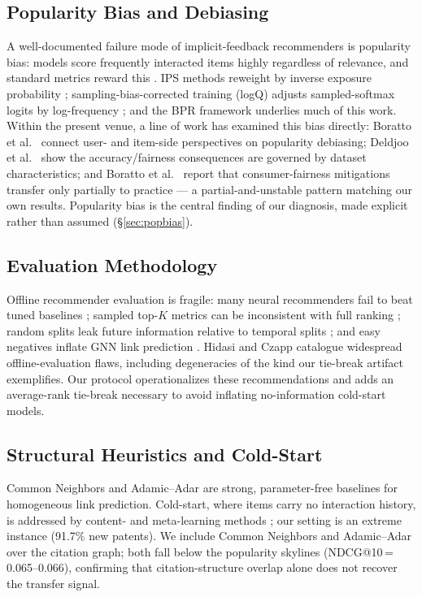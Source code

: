 \documentclass[preprint,12pt]{elsarticle}
\begin{document}
\subsection{Popularity Bias and Debiasing}
A well-documented failure mode of implicit-feedback recommenders is popularity bias:
models score frequently interacted items highly regardless of relevance, and standard
metrics reward this \cite{abdollahpouri2019,steck2018}. IPS methods reweight by inverse
exposure probability \cite{schnabel2016,saito2020}; sampling-bias-corrected training
(logQ) adjusts sampled-softmax logits by log-frequency \cite{yi2019}; and the BPR
framework \cite{rendle2009} underlies much of this work. Within the present venue, a
line of work has examined this bias directly: Boratto et al.\ \cite{boratto2021}
connect user- and item-side perspectives on popularity debiasing; Deldjoo et al.\
\cite{deldjoo2021} show the accuracy/fairness consequences are governed by dataset
characteristics; and Boratto et al.\ \cite{boratto2023} report that consumer-fairness
mitigations transfer only partially to practice --- a partial-and-unstable pattern
matching our own results. Popularity bias is the central finding of our diagnosis,
made explicit rather than assumed (\S\ref{sec:popbias}).

\subsection{Evaluation Methodology}
Offline recommender evaluation is fragile: many neural recommenders fail to beat
tuned baselines \cite{dacrema2019,rendle2019}; sampled top-$K$ metrics can be
inconsistent with full ranking \cite{krichene2020,canamares2020,ihemelandu2023};
random splits leak future information relative to temporal splits
\cite{meng2020,ji2023}; and easy negatives inflate GNN link prediction \cite{li2023}.
Hidasi and Czapp \cite{hidasi2023} catalogue widespread offline-evaluation flaws,
including degeneracies of the kind our tie-break artifact exemplifies. Our protocol
operationalizes these recommendations and adds an average-rank tie-break necessary to
avoid inflating no-information cold-start models.

\subsection{Structural Heuristics and Cold-Start}
Common Neighbors and Adamic--Adar are strong, parameter-free baselines for
homogeneous link prediction. Cold-start, where items carry no interaction history,
is addressed by content- and meta-learning methods \cite{volkovs2017}; our setting is
an extreme instance (91.7\% new patents). We include Common Neighbors and
Adamic--Adar over the citation graph; both fall below the popularity skylines
(NDCG@10\,=\,0.065--0.066), confirming that citation-structure overlap alone does not
recover the transfer signal.
\end{document}
